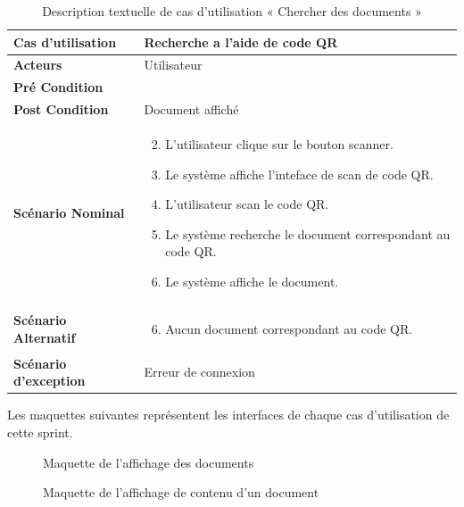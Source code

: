 \begin{longtable}{|p{5cm}|p{10cm}|}
  \caption{Description textuelle de cas d'utilisation « Chercher des documents »} \label{tab:DescriptionTextuelleDeCasDUtilisationChercherDesDocumentsQR} \\
\hline
\textbf{Cas d'utilisation}&Recherche a l'aide de code QR\\
\hline
\textbf{Acteurs}&Utilisateur\\
\hline
\textbf{Pré Condition}&\\
\hline
\textbf{Post Condition}&Document affiché\\
\hline
\textbf{Scénario Nominal}&
\vspace{-\baselineskip}
\begin{enumerate}
    \setcounter{enumi}{1}
    \item L'utilisateur clique sur le bouton scanner.
    \item Le système affiche l'inteface de scan de code QR.
    \item L'utilisateur scan le code QR.
    \item Le système recherche le document correspondant au code QR.
    \item Le système affiche le document.
\end{enumerate}\\
\hline
\textbf{Scénario Alternatif}&
\vspace{-\baselineskip}
\begin{enumerate}
    \setcounter{enumi}{5}
    \item Aucun document correspondant au code QR.
\end{enumerate}\\
\hline
\textbf{Scénario d'exception}&Erreur de connexion\\
\hline

\end{longtable}


Les maquettes suivantes représentent les interfaces de chaque cas d'utilisation de cette sprint. \\

\begin{figure}[H]
  \centering
  \caption{Maquette de l'affichage des documents}
  \label{fig:design_show_documents}
\end{figure}

\begin{figure}[H]
  \centering
  \caption{Maquette de l'affichage de contenu d'un document}
  \label{fig:design_show_document}
\end{figure}

